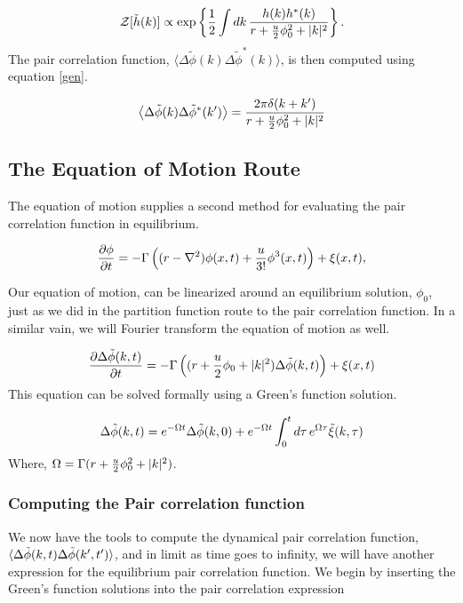 \begin{equation}
\mathcal{Z}[\tilde{h}(k)] \propto \exp\left\lbrace \frac{1}{2}\int dk\,\frac{h(k)h^{*}(k)}{r + \frac{u}{2}\phi_0^2 +  \vert k \vert^2}\right\rbrace.
\end{equation}
The pair correlation function, $\langle \Delta\tilde{\phi}(k)\Delta\tilde{\phi}^{*}(k)\rangle$, is then computed using equation \ref{gen}.

\begin{equation}
\left\langle \Delta\tilde{\phi}(k)\Delta\tilde{\phi}^{*}(k^\prime) \right\rangle = \frac{2\pi \delta(k+k^\prime)}{r + \frac{u}{2}\phi_0^2 + \vert k \vert^2} 
\end{equation}

\subsection{The Equation of Motion Route}

The equation of motion supplies a second method for evaluating the pair correlation function in equilibrium. 

\begin{equation}
\frac{\partial \phi}{\partial t} = -\Gamma\left((r-\nabla^2)\phi(x,t) + \frac{u}{3!}\phi^3(x,t)\right) + \xi(x, t),
\end{equation}

Our equation of motion, can be linearized around an equilibrium solution, $\phi_0$, just as we did in the partition function route to the pair correlation function. In a similar vain, we will Fourier transform the equation of motion as well. 

\begin{equation}
\frac{\partial \Delta\tilde{\phi}(k, t)}{\partial t} = -\Gamma\left((r + \frac{u}{2}\phi_0 + \vert k \vert^2)\Delta\tilde{\phi}(k,t)\right) + \xi(x,t)
\end{equation}
This equation can be solved formally using a Green's function solution.

\begin{equation}
\Delta\tilde{\phi}(k, t) = e^{-\Omega t}\Delta\tilde{\phi}(k, 0) + e^{-\Omega t}\int_0^t d\tau \,e^{\Omega \tau} \tilde{\xi}(k, \tau)
\end{equation}
Where, $\Omega = \Gamma (r + \frac{u}{2}\phi_0^2 + \vert k \vert^2)$.

\subsubsection{Computing the Pair correlation function}

We now have the tools to compute the dynamical pair correlation function, $\langle \Delta\tilde{\phi}(k, t)\Delta\tilde{\phi}(k^\prime, t^\prime) \rangle $, and in limit as time goes to infinity, we will have another expression for the equilibrium pair correlation function. We begin by inserting the Green's function solutions into the pair correlation expression 

